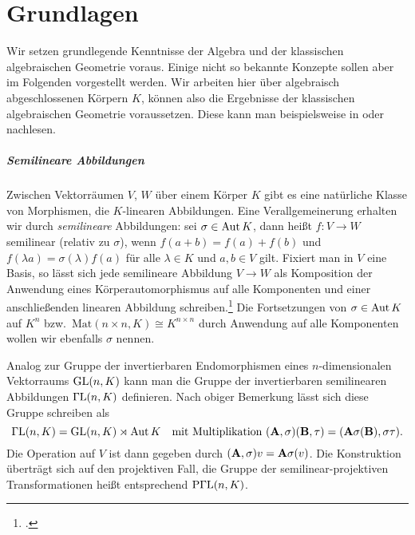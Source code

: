 \chapter{Grundlagen} \label{chap:prelim}
Wir setzen grundlegende Kenntnisse der Algebra und der klassischen algebraischen Geometrie voraus. Einige nicht so bekannte Konzepte sollen aber im Folgenden vorgestellt werden. Wir arbeiten hier über algebraisch abgeschlossenen Körpern $K$, können also die Ergebnisse der klassischen algebraischen Geometrie voraussetzen. Diese kann man beispielsweise in \cite{Shafarevich} oder \cite{Mumford} nachlesen.

\paragraph{Semilineare Abbildungen} Zwischen Vektorräumen $V$, $W$ über einem Körper $K$ gibt es eine natürliche Klasse von Morphismen, die $K$-linearen Abbildungen. Eine Verallgemeinerung erhalten wir durch \emph{semilineare} Abbildungen: sei $\sigma \in \operatorname{Aut} K$, dann heißt $f: V \to W$ semilinear (relativ zu $\sigma$), wenn $f(a+b) = f(a) + f(b)$ und $f(\lambda a) = \sigma(\lambda)f(a)$ für alle $\lambda \in K$ und $a, b \in V$ gilt. Fixiert man in $V$ eine Basis, so lässt sich jede semilineare Abbildung $V \to W$ als Komposition der Anwendung eines Körperautomorphismus auf alle Komponenten und einer anschließenden linearen Abbildung schreiben.\footcite[Das folgt leicht aus den Bemerkungen in][S.~2--3]{Dieudonne} Die Fortsetzungen von $\sigma \in \operatorname{Aut} K$ auf $K^n$ bzw.~$\mathrm{Mat}(n \times n, K) \cong K^{n \times n}$ durch Anwendung auf alle Komponenten wollen wir ebenfalls $\sigma$ nennen.

Analog zur Gruppe der invertierbaren Endomorphismen eines $n$-dimensionalen Vektorraums $\mathrm{GL}(n,K)$ kann man die Gruppe der invertierbaren semilinearen Abbildungen $\mathrm{\Gamma L}(n,K)$ definieren. Nach obiger Bemerkung lässt sich diese Gruppe schreiben als
\begin{equation}
\mathrm{\Gamma L}(n,K) = \mathrm{GL}(n,K) \rtimes \operatorname{Aut} K \quad\text{mit Multiplikation } (\mathbf{A}, \sigma)(\mathbf{B}, \tau) = (\mathbf{A} \sigma(\mathbf{B}), \sigma \tau).
\end{equation}
Die Operation auf $V$ ist dann gegeben durch $(\mathbf{A}, \sigma)v = \mathbf{A} \sigma(v)$. Die Konstruktion überträgt sich auf den projektiven Fall, die Gruppe der semilinear-projektiven Transformationen heißt entsprechend $\mathrm{P\Gamma L}(n,K)$.

